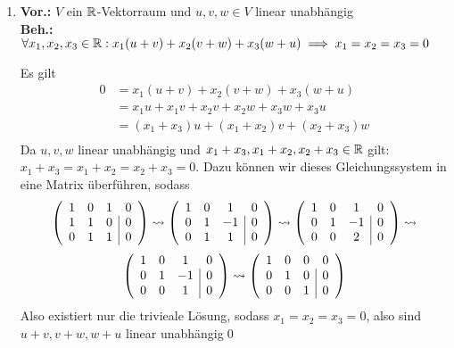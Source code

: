 \documentclass{gadsescript}
\begin{document}
\maketitle
\begin{enumerate}[label=(\roman*)]
	\item \textbf{Vor.:} $ V $ ein $ \mathbb{R}  $-Vektorraum und $ u, v, w \in V $ linear unabhängig\\
		\textbf{Beh.:} $ \forall x_1,x_2,x_3\in \mathbb{R} : x_1(u+v) + x_2(v+w) + x_3(w+u) \implies x_1 = x_2 = x_3 = 0 $ 
		\begin{proof*}
			Es gilt
			\begin{align*}
				0&= x_1(u+v) + x_2(v+w) + x_3(w+u) \\
				~&= x_1u + x_1v + x_2v + x_2w + x_3w + x_3u \\
				~&= (x_1+ x_3)u + (x_1 + x_2) v + (x_2 + x_3) w \\
			\end{align*}
			Da $ u, v, w $ linear unabhängig und $ x_1+x_3,x_1+x_2,x_2+x_3 \in \mathbb{R}  $ gilt:
			$ x_1+x_3 = x_1+x_2 = x_2+x_3 = 0 $. Dazu können wir dieses Gleichungssystem in eine Matrix überführen, sodass
			\[
				\left(\begin{array}{c c c | c} 1 & 0 & 1 &0\\ 1 & 1 & 0 & 0 \\ 0 & 1 & 1 & 0\end{array}\right) \rightsquigarrow
				\left(\begin{array}{c c c | c} 1 & 0 & 1 &0\\ 0 & 1 & -1 & 0 \\ 0 & 1 & 1 & 0\end{array}\right) \rightsquigarrow
				\left(\begin{array}{c c c | c} 1 & 0 & 1 &0\\ 0 & 1 & -1 & 0 \\ 0 & 0 & 2 & 0\end{array}\right) \rightsquigarrow
			\]
			\[
				\left(\begin{array}{c c c | c} 1 & 0 & 1 &0\\ 0 & 1 & -1 & 0 \\ 0 & 0 & 1 & 0\end{array}\right) \rightsquigarrow
				\left(\begin{array}{c c c | c} 1 & 0 & 0 &0\\ 0 & 1 & 0 & 0 \\ 0 & 0 & 1 & 0\end{array}\right) 
			\]
			Also existiert nur die trivieale Lösung, sodass $ x_1 = x_2 = x_3 = 0 $, also sind $ u+v, v+w, w+u $ linear unabhängig\qed

\end{proof*}
\end{enumerate}
\end{document}

